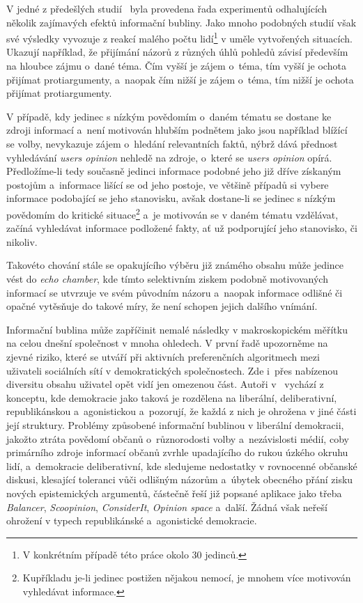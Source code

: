 \documentclass[12pt, a4paper]{article}
\numberwithin{equation}{section} 	%
\begin{document}
V jedné z předešlých studií~\cite{BeyondFilterBubble} byla provedena řada experimentů odhalujících několik zajímavých efektů informační bubliny. Jako mnoho podobných studií však své výsledky vyvozuje z reakcí malého počtu lidí\footnote{V konkrétním případě této práce okolo 30 jedinců.} v uměle vytvořených situacích. Ukazují například, že přijímání názorů z různých úhlů pohledů závisí především na hloubce zájmu o~dané téma. Čím vyšší je zájem o~téma, tím vyšší je ochota přijímat protiargumenty, a~naopak čím nižší je zájem o~téma, tím nižší je ochota přijímat protiargumenty.

V případě, kdy jedinec s nízkým povědomím o~daném tématu se dostane ke zdroji informací a~není motivován hlubším podnětem jako jsou například blížící se volby, nevykazuje zájem o~hledání relevantních faktů, nýbrž dává přednost vyhledávání \textit{users opinion} nehledě na zdroje, o~které se \textit{users opinion} opírá. Předložíme-li tedy současně jedinci informace podobné jeho již dříve získaným postojům a~informace lišící se od jeho postoje, ve většině případů si vybere informace podobající se jeho stanovisku, avšak dostane-li se jedinec s nízkým povědomím do kritické situace\footnote{Kupříkladu je-li jedinec postižen nějakou nemocí, je mnohem více motivován vyhledávat informace.} a~je motivován se v daném tématu vzdělávat, začíná vyhledávat informace podložené fakty, ať už podporující jeho stanovisko, či nikoliv.

Takovéto chování stále se opakujícího výběru již známého obsahu může jedince vést do \textit{echo chamber}, kde tímto selektivním ziskem podobně motivovaných informací se utvrzuje ve svém původním názoru a~naopak informace odlišné či opačné vytěsňuje do takové míry, že není schopen jejich dalšího vnímání.

Informační bublina může zapříčinit nemalé následky v makroskopickém mě\-ří\-tku na celou dnešní společnost v mnoha ohledech. V první řadě upozorněme na zjevné riziko, které se utváří při aktivních preferenčních algoritmech mezi uživateli sociálních sítí v demokratických společnostech. Zde i~přes nabízenou diversitu obsahu uživatel opět vidí jen omezenou část. Autoři v~\cite{BreakingTheFilterBubble} vychází z konceptu, kde demokracie jako taková je rozdělena na liberální, deliberativní, republikánskou a~agonistickou a~pozorují, že každá z nich je ohrožena v jiné části její struktury. Problémy způsobené informační bublinou v liberální demokracii, jakožto ztráta povědomí občanů o~různorodosti volby a~nezávislosti médií, coby primárního zdroje informací občanů zvrhle upadajícího do rukou úzkého okruhu lidí, a~demokracie deliberativní, kde sledujeme nedostatky v rovnocenné občanské diskusi, klesající toleranci vůči odlišným názorům a~úbytek obecného přání zisku nových epistemických argumentů, částečně řeší již popsané aplikace jako třeba \textit{Balancer}, \textit{Scoopinion}, \textit{ConsiderIt}, \textit{Opinion space} a~další. Žádná však neřeší ohrožení v typech republikánské a~agonistické demokracie.
\end{document}
